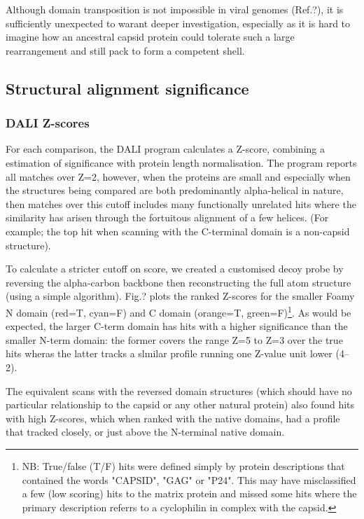 Although domain transposition is not impossible in viral genomes (Ref.?),  it is sufficiently
unexpected to warant deeper investigation, especially as it is hard to imagine how an ancestral
capsid protein could tolerate such a large rearrangement and still pack to form a competent shell.

\subsection{Structural alignment significance}

\subsubsection{DALI Z-scores}

For each comparison, the DALI program calculates a Z-score, combining a estimation of significance
with protein length normalisation.   The program reports all matches over Z=2, however, when the
proteins are small and especially when the structures being compared are both predominantly
alpha-helical in nature, then matches over this cutoff includes many functionally unrelated
hits where the similarity has arisen through the fortuitous alignment of a few helices.
(For example; the top hit when scanning with the C-terminal domain is a non-capsid structure).

To calculate a stricter cutoff on score, we created a customised decoy probe by reversing the
alpha-carbon backbone then reconstructing the full atom structure (using a simple algorithm).
Fig.? plots the ranked Z-scores for the smaller Foamy N domain (red=T, cyan=F) and C domain
(orange=T, green=F)\footnote{
NB: True/false (T/F) hits were defined simply by protein descriptions that contained the
words "CAPSID", "GAG" or "P24".   This may have misclassified a few (low scoring) hits to the matrix protein
and missed some hits where the primary description referrs to a cyclophilin in complex with the capsid. 
}.   As would be expected, the larger C-term domain has hits with a higher significance than the
smaller N-term domain:  the former covers the range Z=5 to Z=3 over the true hits wheras the
latter tracks a slmilar profile running one Z-value unit lower (4--2).

The equivalent scans with the reversed domain structures (which should have no particular
relationship to the capsid or any other natural protein) also found hits with high Z-scores,
which when ranked with the native domains, had a profile that tracked closely, or just above
the N-terminal native domain.
 

